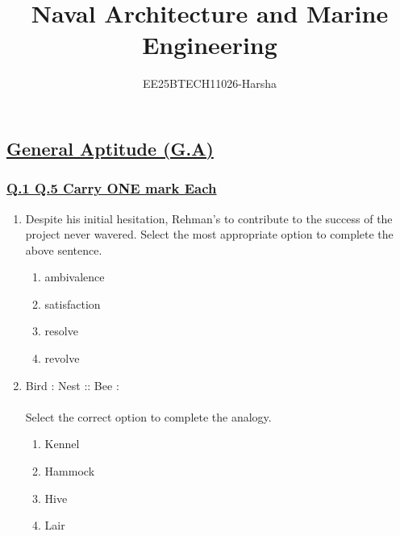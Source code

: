 \documentclass[journal]{IEEEtran}
\theoremstyle{remark}
\begin{document}

\onecolumn

\title{Naval Architecture and Marine Engineering}
\author{EE25BTECH11026-Harsha}
\maketitle

\renewcommand{\thefigure}{\theenumi}
\renewcommand{\thetable}{\theenumi}
\setcounter{secnumdepth}{0}
\subsection{\underline{\textbf{General Aptitude (G.A)}}}
\subsubsection{\underline{Q.1 \text{-} Q.5 Carry ONE mark Each}}
\setlength{\parskip}{1em}

\begin{enumerate}
\item Despite his initial hesitation, Rehman's \underline{\hspace{1cm}} to contribute to the success of
the project never wavered. Select the most appropriate option to complete the above sentence.
\begin{multicols}{4}
\begin{enumerate}
    \item ambivalence
    \item satisfaction
    \item resolve
    \item revolve
\end{enumerate}
\end{multicols}
\end{enumerate}

\begin{enumerate}[itemsep=1em]
\setcounter{enumi}{1}
\item Bird : Nest :: Bee : \underline{\hspace{1cm}}\\
\\
Select the correct option to complete the analogy.
\begin{multicols}{4}
\begin{enumerate}
    \item Kennel
    \item Hammock
    \item Hive
    \item Lair
\end{enumerate}
\end{multicols}
\end{enumerate}
\end{document}
